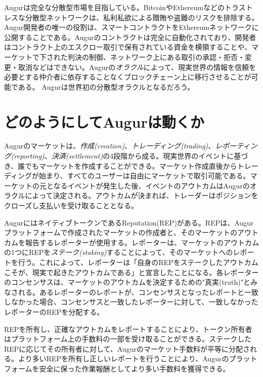 \documentclass[floatfix,reprint,nofootinbib,amsmath,amssymb,epsfig,pre,floats,letterpaper,groupedaffiliation]{revtex4-1}
\theoremstyle{definition}
\theoremstyle{definition}
\theoremstyle{definition}
\begin{document}
Augurは完全な分散型市場を目指している。Bitcoin\cite{Nakamoto_2008}やEthereum\cite{Buterin_2013}などのトラストレスな分散型ネットワークは、私利私欲による贈賄や盗難のリスクを排除する。Augur開発者の唯一の役割は、スマートコントラクトをEthereumネットワークに公開することである。Augurのコントラクトは完全に自動化されており、開発者はコントラクト上のエスクロー取引で保有されている資金を横領することや、マーケットで下された判決の制御、ネットワーク上にある取引の承認・拒否・変更・取消などはできない。Augurの\textit{オラクル}によって、現実世界の情報を信頼を必要とする仲介者に依存することなくブロックチェーン上に移行させることが可能である。 Augurは世界初の分散型オラクルとなるだろう。

\section{どのようにしてAugurは動くか}

Augurのマーケットは、\textit{作成(creation)}、\textit{トレーディング(trading)}、\textit{レポーティング(reporting)}、\textit{決済(settlement)}の4段階から成る。現実世界のイベントに基づき、誰でもマーケットを作成することができる。マーケット作成直後からトレーディングが始まり、すべてのユーザーは自由にマーケットで取引可能である。マーケットの元となるイベントが発生した後、イベントのアウトカムはAugurのオラクルによって決定される。アウトカムが決まれば、トレーダーはポジションをクローズし支払いを受け取ることとなる。

AugurにはネイティブトークンであるReputation(REP)がある。REPは、Augurプラットフォームで作成されたマーケットの作成者と、そのマーケットのアウトカムを報告するレポーターが使用する。レポーターは、マーケットのアウトカムの1つにREPを\textit{ステーク(staking)}することによって、そのマーケットへのレポートを行う。これによって、レポーターは「自身のREPをステークしたアウトカムこそが、現実で起きたアウトカムである」と宣言したことになる。各レポーターのコンセンサスは、マーケットのアウトカムを決定するための"真実(truth)"とみなされる。あるレポーターのレポートが、コンセンサスとなったレポートと一致しなかった場合、コンセンサスと一致したレポーターに対して、一致しなかったレポーターのREPを分配する。

REPを所有し、正確なアウトカムをレポートすることにより、トークン所有者はプラットフォーム上の手数料の一部を受け取ることができる。ステークしたREPに応じてその所有者に対して、Augurのマーケット手数料が平等に分配される。より多いREPを所有し正しいレポートを行うことにより、Augurのプラットフォームを安全に保った作業報酬としてより多い手数料を獲得できる。
\end{document}
